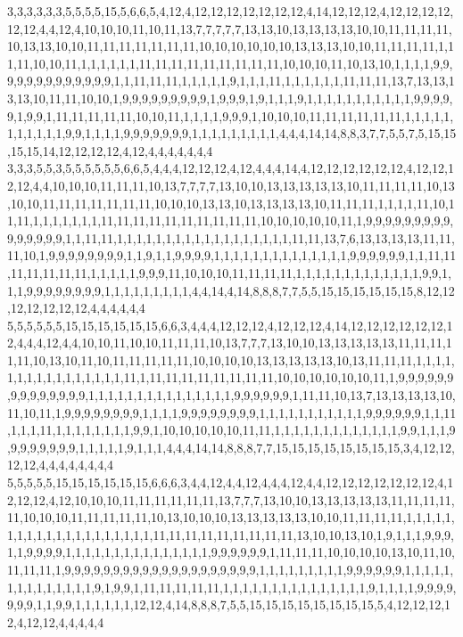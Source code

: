 3,3,3,3,3,3,5,5,5,5,15,5,6,6,5,4,12,4,12,12,12,12,12,12,12,4,14,12,12,12,4,12,12,12,12,12,12,4,4,12,4,10,10,10,11,10,11,13,7,7,7,7,7,13,13,10,13,13,13,13,10,10,11,11,11,11,10,13,13,10,10,11,11,11,11,11,11,11,10,10,10,10,10,10,13,13,13,10,10,11,11,11,11,1,11,11,10,10,11,1,1,1,1,1,1,11,11,11,11,11,11,11,11,11,10,10,10,11,10,13,10,1,1,1,1,9,9,9,9,9,9,9,9,9,9,9,9,9,1,1,11,11,11,1,1,1,1,1,9,1,1,1,11,1,1,1,1,1,1,11,11,11,13,7,13,13,13,13,10,11,11,10,10,1,9,9,9,9,9,9,9,9,9,1,9,9,9,1,9,1,1,1,9,1,1,1,1,1,1,1,1,1,1,1,9,9,9,9,9,1,9,9,1,11,11,11,11,11,10,10,11,1,1,1,1,9,9,9,1,10,10,10,11,11,11,11,11,11,1,1,1,1,1,1,1,1,1,1,1,9,9,1,1,1,1,9,9,9,9,9,9,9,1,1,1,1,1,1,1,1,1,4,4,4,14,14,8,8,3,7,7,5,5,7,5,15,15,15,15,14,12,12,12,12,4,12,4,4,4,4,4,4,4
3,3,3,5,5,3,5,5,5,5,5,5,6,6,5,4,4,4,12,12,12,4,12,4,4,4,14,4,12,12,12,12,12,12,4,12,12,12,12,4,4,10,10,10,11,11,11,10,13,7,7,7,7,13,10,10,13,13,13,13,13,10,11,11,11,11,10,13,10,10,11,11,11,11,11,11,11,10,10,10,13,13,10,13,13,13,13,10,11,11,11,1,1,1,1,11,10,11,11,1,1,1,1,1,1,1,11,11,11,11,11,11,11,11,11,11,10,10,10,10,10,11,1,9,9,9,9,9,9,9,9,9,9,9,9,9,9,9,1,1,11,11,1,1,1,1,1,1,1,1,1,1,1,1,1,1,1,1,1,1,11,11,13,7,6,13,13,13,13,11,11,11,10,1,9,9,9,9,9,9,9,9,1,1,9,1,1,9,9,9,9,1,1,1,1,1,1,1,1,1,1,1,1,1,1,9,9,9,9,9,9,1,1,11,11,11,11,11,11,11,1,1,1,1,1,9,9,9,11,10,10,10,11,11,11,11,1,1,1,1,1,1,1,1,1,1,1,1,1,9,9,1,1,1,9,9,9,9,9,9,9,9,1,1,1,1,1,1,1,1,1,4,4,14,4,14,8,8,8,7,7,5,5,15,15,15,15,15,15,8,12,12,12,12,12,12,12,4,4,4,4,4,4
5,5,5,5,5,5,15,15,15,15,15,15,6,6,3,4,4,4,12,12,12,4,12,12,12,4,14,12,12,12,12,12,12,12,4,4,4,12,4,4,10,10,11,10,10,11,11,11,10,13,7,7,7,13,10,10,13,13,13,13,13,11,11,11,11,11,10,13,10,11,10,11,11,11,11,11,10,10,10,10,13,13,13,13,13,10,13,11,11,11,1,1,1,1,1,1,1,1,1,1,1,1,1,1,1,1,11,1,11,11,11,11,11,11,11,11,10,10,10,10,10,10,11,1,9,9,9,9,9,9,9,9,9,9,9,9,9,9,1,1,1,1,1,1,1,1,1,1,1,1,1,1,1,9,9,9,9,9,9,1,11,11,10,13,7,13,13,13,13,10,11,10,11,1,9,9,9,9,9,9,9,9,1,1,1,1,9,9,9,9,9,9,9,9,1,1,1,1,1,1,1,1,1,1,1,9,9,9,9,9,9,1,1,11,1,1,1,11,1,1,1,1,1,1,1,1,9,9,1,10,10,10,10,10,11,11,1,1,1,1,1,1,1,1,1,1,1,1,1,9,9,1,1,1,9,9,9,9,9,9,9,9,1,1,1,1,1,9,1,1,1,4,4,4,14,14,8,8,8,7,7,15,15,15,15,15,15,15,15,3,4,12,12,12,12,4,4,4,4,4,4,4,4
5,5,5,5,5,15,15,15,15,15,15,6,6,6,3,4,4,12,4,4,12,4,4,4,12,4,4,12,12,12,12,12,12,12,4,12,12,12,4,12,10,10,10,11,11,11,11,11,11,13,7,7,7,13,10,10,13,13,13,13,13,11,11,11,11,11,10,10,10,11,11,11,11,11,10,13,10,10,10,13,13,13,13,13,10,10,11,11,11,11,1,1,1,1,1,1,1,1,1,1,1,1,1,1,1,1,1,1,1,1,11,11,11,11,11,11,11,11,11,13,10,10,13,10,1,9,1,1,1,9,9,9,1,1,9,9,9,9,1,1,1,1,1,1,1,1,1,1,1,1,1,1,1,9,9,9,9,9,9,1,11,11,11,10,10,10,10,13,10,11,10,11,11,11,1,9,9,9,9,9,9,9,9,9,9,9,9,9,9,9,9,9,9,9,9,1,1,1,1,1,1,1,1,1,9,9,9,9,9,9,1,1,1,1,1,1,1,1,1,1,1,1,1,1,9,1,9,9,1,11,11,11,11,11,1,1,1,1,1,1,1,1,1,1,1,1,1,1,1,9,1,1,1,1,9,9,9,9,9,9,9,1,1,9,9,1,1,1,1,1,1,12,12,4,14,8,8,8,7,5,5,15,15,15,15,15,15,15,15,5,4,12,12,12,12,4,12,12,4,4,4,4,4
